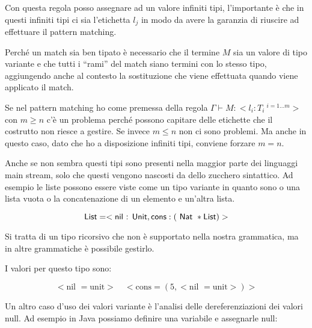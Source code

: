 \begin{prooftree}
\end{prooftree}

\noindent Con questa regola posso assegnare ad un valore infiniti tipi, l'importante è che in questi infiniti tipi ci sia l'etichetta $l_j$ in modo da avere la garanzia di riuscire ad effettuare il pattern matching.

\begin{prooftree}
\end{prooftree}

\noindent Perché un match sia ben tipato è necessario che il termine $M$ sia un valore di tipo variante e che tutti i ``rami'' del match siano termini con lo stesso tipo, aggiungendo anche al contesto la sostituzione che viene effettuata quando viene applicato il match.

Se nel pattern matching ho come premessa della regola $\Gamma \vdash M : < l_i : T_i  \:^{i=1\ldots m}>$ con $m \geq n$ c'è un problema perché possono capitare delle etichette che il costrutto  non riesce a gestire. Se invece $m \leq n$ non ci sono problemi. Ma anche in questo caso, dato che ho a disposizione infiniti tipi, conviene forzare $m = n$.

Anche se non sembra questi tipi sono presenti nella maggior parte dei linguaggi main stream, solo che questi vengono nascosti da dello zucchero sintattico. Ad esempio le liste possono essere viste come un tipo variante in quanto sono o una lista vuota o la concatenazione di un elemento e un'altra lista.

$$
\text{List} = < \text{nil : Unit}, \text{cons} : (\Nat * \text{List}) >
$$

\noindent Si tratta di un tipo ricorsivo che non è supportato nella nostra grammatica, ma in altre grammatiche è possibile gestirlo.

I valori per questo tipo sono:

$$
<\text{nil } = \text{unit}>  \quad <\text{cons} = (5, <\text{nil } = \text{unit}>)>
$$

\noindent Un altro caso d'uso dei valori variante è l'analisi delle dereferenziazioni dei valori null.
Ad esempio in Java possiamo definire una variabile e assegnarle null:

